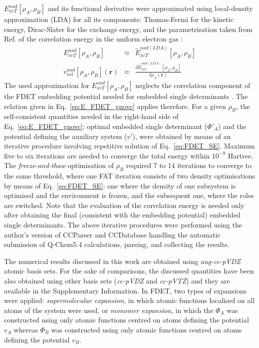 \documentclass[amsmath,amssymb,preprint,aip,jcp]{revtex4-1}
\begin{document}
$E_{xcT}^{nad}[\rho_A,\rho_B]$ and its functional derivative were approximated using local-density approximation (LDA) for all its components: Thomas-Fermi \cite{Thomas1927, Fermi1928} for the kinetic energy, Dirac-Slater\cite{Slater1929} for the exchange energy, 
and the parametrisation taken from Ref.  of the correlation energy in the uniform electron gas  \cite{Ceperley1980}:
\begin{eqnarray}
{E}_{xcT}^{nad}[\rho_A,\rho_B]&\approx& \tilde {E}_{xcT}^{nad(LDA)}[\rho_A,\rho_B] \\
v_{xct}^{nad}[\rho_A,\rho_B](\mathbf{r})&\approx&\frac{\delta \tilde{E}_{xct}^{nad(LDA)}[\rho_A,\rho_B]}{\delta\rho_A(\mathbf{r})}
\end{eqnarray}
The used approximation for ${E}_{xcT}^{nad}[\rho_A,\rho_B]$ neglects the correlation component of the FDET embedding potential needed for embedded single determinants \cite{Wesolowski2008}.   The relation given in Eq.~\ref{eq:E_FDET_gnovc} applies therefore. 
For a given $\rho_B$, the self-consistent quantities needed in the right-hand side of Eq.~\ref{eq:E_FDET_gnovc}: 
optimal embedded single determinant ($\Phi'_A$) and the potential defining the auxiliary system ($v'$), 
were obtained by means of an iterative procedure involving repetitive solution of Eq.~\ref{eq:FDET_SE}. 
Maximum five to six iterations are needed to converge the total energy within $10^{-9}$ Hartree. 
The \textit{freeze-and-thaw} optimisation of $\rho_B$ required 7 to 14 iterations to converge to the same threshold, where one FAT iteration consists of two density optimisations by means of Eq.~\ref{eq:FDET_SE}: one where the density of one subsystem is optimised and the environment is frozen, and the subsequent one, where the roles are switched. 
Note that the evaluation of the correlation energy is needed only after obtaining the final (consistent with the embedding potential) embedded single determinants. 
The above iterative procedures
were performed using the author's version \cite{CCParser_Ricardi} of CCParser\cite{CCParser_Zech} and CCDatabase\cite{CCDatabase} handling the automatic submission of Q-Chem5.4\cite{Qchem54} calculations, parsing, and collecting the results.

{\color{red} The numerical results discussed in this work are obtained using {\it aug-cc-pVDZ} atomic basis sets. For the sake of comparisons, the discussed quantities have been also obtained using other basis sets  ({\it cc-pVDZ} and {\it cc-pVTZ}) and they are available in the Supplementary Information.} 
In FDET, two types of expansions were applied: {\it supermolecular expansion}, in which atomic functions localised on all atoms of the system were used, or {\it monomer expansion}, in which the $\Phi_A$ was constructed using only 
atomic functions centred on atoms defining the potential $v_A$ whereas $\Phi_B$ was constructed using only atomic functions centred on atoms defining the potential $v_B$.
\end{document}
